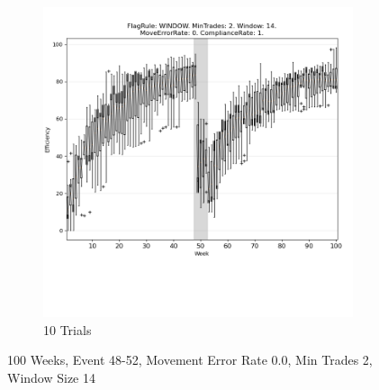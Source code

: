\documentclass{article}%
\begin{document}
\begin{figure}[!htb]
\begin{subfigure}[b]{0.45\linewidth}
\includegraphics[clip,width=\linewidth,trim=0 4cm 0 0]{0053fr_WINDOW_mt_2_ws_14_er_0_cr_1_t10.png}%
\caption{10 Trials}%
\end{subfigure}%
\caption{100 Weeks, Event 48{-}52, Movement Error Rate 0.0, Min Trades 2, Window Size 14}%
\end{figure}

%
\end{document}
